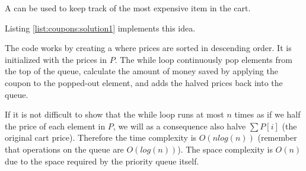 A  can be used to keep track of the most expensive item in the cart.

Listing \ref{list:coupons:solution1} implements this idea.



The code works by creating a  where prices are sorted in descending order. It is initialized with the prices in $P$.
The while loop continuously pop elements from the top of the queue, calculate the amount of money saved by applying the coupon to the popped-out element, and adds the halved prices back into the queue.

If it is not difficult to show that the while loop runs at most $n$ times as if we half the price of each element in $P$, we will as a consequence also halve $\sum P[i]$ (the original cart price). 
Therefore the time complexity is $O(nlog(n))$ (remember that operations on the queue are $O(log(n))$). The space complexity is $O(n)$ due to the space required by the priority queue itself.
